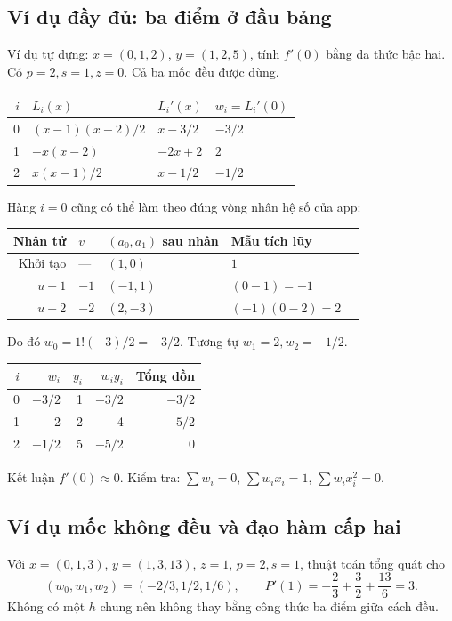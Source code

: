 \subsection{Ví dụ đầy đủ: ba điểm ở đầu bảng}
Ví dụ tự dựng: $x=(0,1,2)$, $y=(1,2,5)$, tính $f'(0)$ bằng đa thức bậc hai. Có $p=2,s=1,z=0$. Cả ba mốc đều được dùng.
\begin{center}
\begin{tabular}{rlll}
\toprule $i$&$L_i(x)$&$L_i'(x)$&$w_i=L_i'(0)$\\\midrule
0&$(x-1)(x-2)/2$&$x-3/2$&$-3/2$\\
1&$-x(x-2)$&$-2x+2$&$2$\\
2&$x(x-1)/2$&$x-1/2$&$-1/2$\\\bottomrule
\end{tabular}
\end{center}
Hàng $i=0$ cũng có thể làm theo đúng vòng nhân hệ số của app:
\begin{center}
\begin{tabular}{rllll}
\toprule Nhân tử & $v$ & $(a_0,a_1)$ sau nhân & Mẫu tích lũy\\\midrule
Khởi tạo&---&$(1,0)$&$1$\\
$u-1$&$-1$&$(-1,1)$&$(0-1)=-1$\\
$u-2$&$-2$&$(2,-3)$&$(-1)(0-2)=2$\\\bottomrule
\end{tabular}
\end{center}
Do đó $w_0=1!(-3)/2=-3/2$. Tương tự $w_1=2,w_2=-1/2$.
\begin{center}
\begin{tabular}{rrrrr}
\toprule $i$&$w_i$&$y_i$&$w_iy_i$&Tổng dồn\\\midrule
0&$-3/2$&1&$-3/2$&$-3/2$\\
1&2&2&4&$5/2$\\
2&$-1/2$&5&$-5/2$&0\\\bottomrule
\end{tabular}
\end{center}
Kết luận $f'(0)\approx0$. Kiểm tra: $\sum w_i=0$, $\sum w_ix_i=1$, $\sum w_ix_i^2=0$.

\subsection{Ví dụ mốc không đều và đạo hàm cấp hai}
Với $x=(0,1,3)$, $y=(1,3,13)$, $z=1$, $p=2,s=1$, thuật toán tổng quát cho
\[
(w_0,w_1,w_2)=(-2/3,1/2,1/6),\qquad
P'(1)=-\frac23+\frac32+\frac{13}{6}=3.
\]
Không có một $h$ chung nên không thay bằng công thức ba điểm giữa cách đều.

